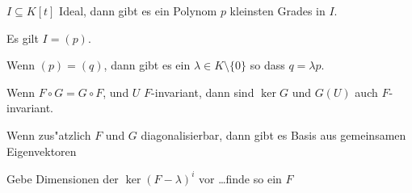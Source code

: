 \documentclass[a4,11pt]{article}
\begin{document}
\vspace*{-17mm}
{
\kopf
}


\begin{aufgabe}[4 Punkte]
$I \subseteq K[t]$ Ideal, dann gibt es ein Polynom $p$ kleinsten
Grades in $I$.

Es gilt $I = (p)$.

Wenn $(p) = (q)$, dann gibt es ein $\lambda \in K \setminus \{0\}$ so
dass $q = \lambda p$.

\end{aufgabe}

\begin{aufgabe}[4 Punkte]
Wenn $F \circ G = G \circ F$, und $U$ $F$-invariant, dann sind $\ker G$
und $G(U)$ auch $F$-invariant.

Wenn zus"atzlich $F$ und $G$ diagonalisierbar, dann gibt es Basis aus
gemeinsamen Eigenvektoren
\end{aufgabe}


\begin{aufgabe}[4 Punkte]
Gebe Dimensionen der $\ker (F -\lambda)^i$ vor \ldots finde so ein $F$  
\end{aufgabe}
\end{document}
